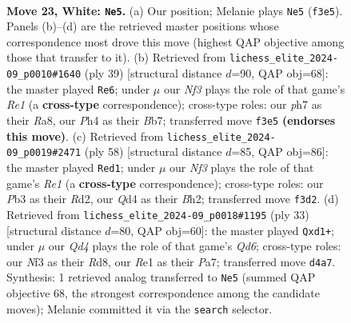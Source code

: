 \documentclass[11pt]{article}
\begin{document}
\begin{figure}[p]
\label{fig:thought-m42}
\end{figure}

\clearpage

\begin{figure}[p]\centering
\begin{subfigure}{0.46\textwidth}\centering
\resizebox{\linewidth}{!}{%
\newchessgame
\chessboard[
  setfen={rr1qb1k1/p4ppp/B4n2/p2p4/3Q2PP/1P3N2/P4P2/R3R1K1 w - - 1 23},
  showmover=false,
  pgfstyle=straightmove, color=movearrow, markmove={f3-e5}
]}
\caption{}
\end{subfigure}\hfill
\begin{subfigure}{0.46\textwidth}\centering
\resizebox{\linewidth}{!}{%
\newchessgame
\chessboard[
  setfen={r3r1k1/1b3p1p/2p2np1/ppq5/4P3/2N4P/PP1Q1PP1/3RRBK1 b - - 1 20},
  showmover=false,
  pgfstyle=straightmove, color=movearrow, markmove={e8-e6}
]}
\caption{}
\end{subfigure}
\\[4pt]
\begin{subfigure}{0.46\textwidth}\centering
\resizebox{\linewidth}{!}{%
\newchessgame
\chessboard[
  setfen={1r4k1/2q2pb1/p3r1pp/2p1p3/P1N1Qn2/7P/1P1R1PPB/4R1K1 w - - 1 30},
  showmover=false,
  pgfstyle=straightmove, color=movearrow, markmove={e1-d1}
]}
\caption{}
\end{subfigure}\hfill
\begin{subfigure}{0.46\textwidth}\centering
\resizebox{\linewidth}{!}{%
\newchessgame
\chessboard[
  setfen={r2r2k1/ppp2pbp/2n3p1/8/8/2BqPN2/PP3PPP/R1QR2K1 b - - 3 17},
  showmover=false,
  pgfstyle=straightmove, color=movearrow, markmove={d3-d1}
]}
\caption{}
\end{subfigure}
\caption{\textbf{Move 23, White: \texttt{Ne5}.} (a) Our position; Melanie plays \texttt{Ne5} (\texttt{f3e5}). Panels (b)--(d) are the retrieved master positions whose correspondence most drove this move (highest QAP objective among those that transfer to it). (b) Retrieved from \texttt{lichess\_elite\_2024-09\_p0010\#1640} (ply 39) [structural distance $d$=90, QAP obj=68]: the master played \texttt{Re6}; under $\mu$ our \emph{Nf3} plays the role of that game's \emph{Re1} (a \textbf{cross-type} correspondence); cross-type roles: our \emph{p}h7 as their \emph{R}a8, our \emph{P}h4 as their \emph{B}b7; transferred move \texttt{f3e5} \textbf{(endorses this move)}. (c) Retrieved from \texttt{lichess\_elite\_2024-09\_p0019\#2471} (ply 58) [structural distance $d$=85, QAP obj=86]: the master played \texttt{Red1}; under $\mu$ our \emph{Nf3} plays the role of that game's \emph{Re1} (a \textbf{cross-type} correspondence); cross-type roles: our \emph{P}b3 as their \emph{R}d2, our \emph{Q}d4 as their \emph{B}h2; transferred move \texttt{f3d2}. (d) Retrieved from \texttt{lichess\_elite\_2024-09\_p0018\#1195} (ply 33) [structural distance $d$=80, QAP obj=60]: the master played \texttt{Qxd1+}; under $\mu$ our \emph{Qd4} plays the role of that game's \emph{Qd6}; cross-type roles: our \emph{N}f3 as their \emph{R}d8, our \emph{R}e1 as their \emph{P}a7; transferred move \texttt{d4a7}. Synthesis: 1 retrieved analog transferred to \texttt{Ne5} (summed QAP objective 68, the strongest correspondence among the candidate moves); Melanie committed it via the \texttt{search} selector.}

\end{figure}
\end{document}
